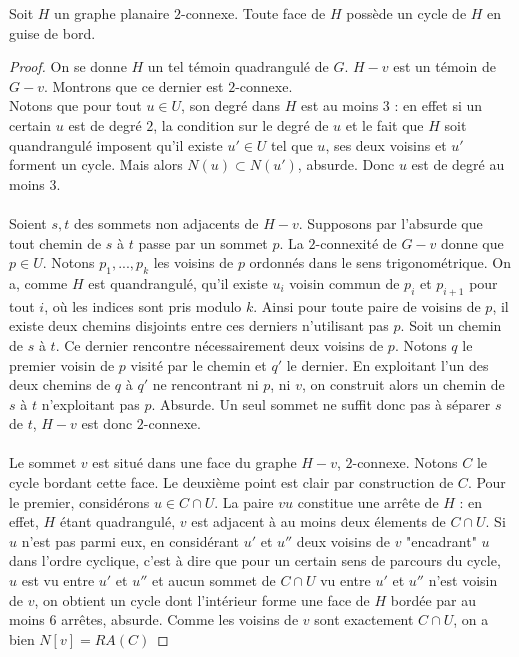 \documentclass{scrartcl}
\begin{document}
\begin{flushleft}
\begin{lem}
    Soit $H$ un graphe planaire $2$-connexe. Toute face de $H$ possède un cycle de $H$ en guise de bord.
\end{lem}

\begin{proof}
    On se donne $H$ un tel témoin quadrangulé de $G$. $H-v$ est un témoin de $G-v$. Montrons que ce dernier est $2$-connexe.\\
    Notons que pour tout $u \in U$, son degré dans $H$ est au moins $3$ : en effet si un certain $u$ est de degré $2$,
    la condition sur le degré de $u$ et le fait que $H$ soit quandrangulé imposent qu'il existe $u' \in U$ tel que $u$,
    ses deux voisins et $u'$ forment un cycle. Mais alors $N(u) \subset N(u')$, absurde. Donc $u$ est de degré au moins $3$.
    \\~\\
    Soient $s, t$ des sommets non adjacents de $H-v$. Supposons par l'absurde que tout chemin de $s$ à $t$ passe par un sommet
    $p$. La $2$-connexité de $G-v$ donne que $p \in U$. Notons $p_1, ..., p_k$ les voisins de $p$ ordonnés dans le sens trigonométrique.
    On a, comme $H$ est quandrangulé, qu'il existe $u_i$ voisin commun de $p_i$ et $p_{i+1}$ pour tout $i$, où les indices sont
    pris modulo $k$. Ainsi pour toute paire de voisins de $p$, il existe deux chemins disjoints entre ces derniers n'utilisant pas $p$.
    Soit un chemin de $s$ à $t$. Ce dernier rencontre nécessairement deux voisins de $p$. Notons $q$ le premier voisin de $p$
    visité par le chemin et $q'$ le dernier. En exploitant l'un des deux chemins de $q$ à $q'$ ne rencontrant ni $p$, ni $v$,
    on construit alors un chemin de $s$ à $t$ n'exploitant pas $p$. Absurde. Un seul sommet ne suffit donc pas à séparer $s$ de $t$,
    $H-v$ est donc $2$-connexe.
    \\~\\
    Le sommet $v$ est situé dans une face du graphe $H-v$, $2$-connexe. Notons $C$ le cycle bordant cette face. Le deuxième point
    est clair par construction de $C$. Pour le premier, considérons $u \in C \cap U$. La paire $vu$ constitue une arrête de $H$ :
    en effet, $H$ étant quadrangulé, $v$ est adjacent à au moins deux élements de $C \cap U$. Si $u$ n'est pas parmi eux,
    en considérant $u'$ et $u''$ deux voisins de $v$ "encadrant" $u$ dans l'ordre cyclique, c'est à dire que pour un certain
    sens de parcours du cycle, $u$ est vu entre $u'$ et $u''$ et aucun sommet de $C \cap U$ vu entre $u'$ et $u''$ n'est voisin
    de $v$, on obtient un cycle dont l'intérieur forme une face de $H$ bordée par au moins $6$ arrêtes, absurde. Comme les voisins
    de $v$ sont exactement $C \cap U$, on a bien $N[v] = RA(C)$
\end{proof}


\end{flushleft}
\end{document}
